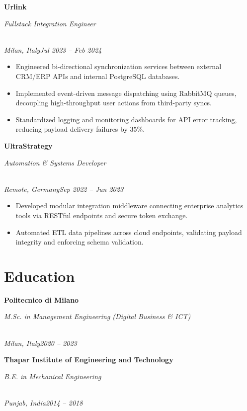\documentclass[a4paper,10pt]{article}
\newcommand{\role}[4]{\vspace{3pt}\noindent\hspace{0.6em}\parbox[t]{0.38\textwidth}{\raggedright\textbf{#1}}\hfill\parbox[t]{0.58\textwidth}{\raggedleft\textit{#2}}\\{\textit{#3}\hfill\textit{#4}}\vspace{1pt}}
\begin{document}
\role{Urlink}{Fullstack Integration Engineer}{Milan, Italy}{Jul 2023 -- Feb 2024}
\begin{itemize}
\item Engineered bi-directional synchronization services between external CRM/ERP APIs and internal PostgreSQL databases.
\item Implemented event-driven message dispatching using RabbitMQ queues, decoupling high-throughput user actions from third-party syncs.
\item Standardized logging and monitoring dashboards for API error tracking, reducing payload delivery failures by 35\%.
\end{itemize}

\role{UltraStrategy}{Automation \& Systems Developer}{Remote, Germany}{Sep 2022 -- Jun 2023}
\begin{itemize}
\item Developed modular integration middleware connecting enterprise analytics tools via RESTful endpoints and secure token exchange.
\item Automated ETL data pipelines across cloud endpoints, validating payload integrity and enforcing schema validation.
\end{itemize}

\section{Education}
\role{Politecnico di Milano}{M.Sc. in Management Engineering (Digital Business \& ICT)}{Milan, Italy}{2020 -- 2023}
\role{Thapar Institute of Engineering and Technology}{B.E. in Mechanical Engineering}{Punjab, India}{2014 -- 2018}
\end{document}

